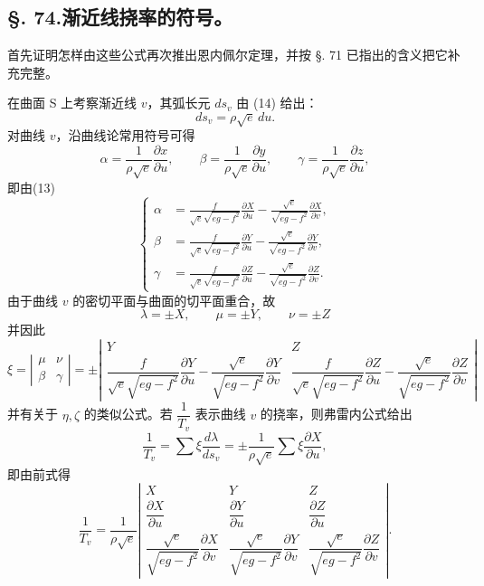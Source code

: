 \subsection*{\S. 74.\quad 渐近线挠率的符号。}

首先证明怎样由这些公式再次推出恩内佩尔定理，并按 \S. 71 已指出的含义把它补充完整。

在曲面 S 上考察渐近线 \(v\)，其弧长元 \(ds_v\) 由 (14) 给出：
\[
 ds_v=\rho\sqrt e\,du.
\]
对曲线 \(v\)，沿曲线论常用符号可得
\[
 \alpha=\frac1{\rho\sqrt e}\frac{\partial x}{\partial u},\qquad
 \beta=\frac1{\rho\sqrt e}\frac{\partial y}{\partial u},\qquad
 \gamma=\frac1{\rho\sqrt e}\frac{\partial z}{\partial u},
\]
即由(13)
\[
\left\{
\begin{aligned}
\alpha&=\frac{f}{\sqrt e\sqrt{eg-f^2}}\frac{\partial X}{\partial u}-\frac{\sqrt e}{\sqrt{eg-f^2}}\frac{\partial X}{\partial v},\\
\beta&=\frac{f}{\sqrt e\sqrt{eg-f^2}}\frac{\partial Y}{\partial u}-\frac{\sqrt e}{\sqrt{eg-f^2}}\frac{\partial Y}{\partial v},\\
\gamma&=\frac{f}{\sqrt e\sqrt{eg-f^2}}\frac{\partial Z}{\partial u}-\frac{\sqrt e}{\sqrt{eg-f^2}}\frac{\partial Z}{\partial v}.
\end{aligned}\right.
\]
由于曲线 \(v\) 的密切平面与曲面的切平面重合，故
\[
 \lambda=\pm X,\qquad \mu=\pm Y,\qquad \nu=\pm Z
\]
并因此
\[
\xi=\left|\begin{matrix}\mu&\nu\\ \beta&\gamma\end{matrix}\right|
=\pm\left|\begin{matrix}
Y&Z\\[0.25em]
\dfrac{f}{\sqrt e\sqrt{eg-f^2}}\dfrac{\partial Y}{\partial u}-\dfrac{\sqrt e}{\sqrt{eg-f^2}}\dfrac{\partial Y}{\partial v}
&
\dfrac{f}{\sqrt e\sqrt{eg-f^2}}\dfrac{\partial Z}{\partial u}-\dfrac{\sqrt e}{\sqrt{eg-f^2}}\dfrac{\partial Z}{\partial v}
\end{matrix}\right|
\]
并有关于 \(\eta,\zeta\) 的类似公式。若 \(\dfrac1{T_v}\) 表示曲线 \(v\) 的挠率，则弗雷内公式给出
\[
 \frac1{T_v}=\sum \xi\frac{d\lambda}{ds_v}=\pm\frac1{\rho\sqrt e}\sum\xi\frac{\partial X}{\partial u},
\]
即由前式得
\[
\frac1{T_v}=\frac1{\rho\sqrt e}
\left|\begin{matrix}
X&Y&Z\\[0.25em]
\dfrac{\partial X}{\partial u}&\dfrac{\partial Y}{\partial u}&\dfrac{\partial Z}{\partial u}\\[0.65em]
\dfrac{\sqrt e}{\sqrt{eg-f^2}}\dfrac{\partial X}{\partial v}&
\dfrac{\sqrt e}{\sqrt{eg-f^2}}\dfrac{\partial Y}{\partial v}&
\dfrac{\sqrt e}{\sqrt{eg-f^2}}\dfrac{\partial Z}{\partial v}
\end{matrix}\right|.
\]
